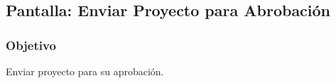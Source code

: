 \subsection{Pantalla: Enviar Proyecto para Abrobación}
\subsubsection{Objetivo}
Enviar proyecto para su aprobación.





